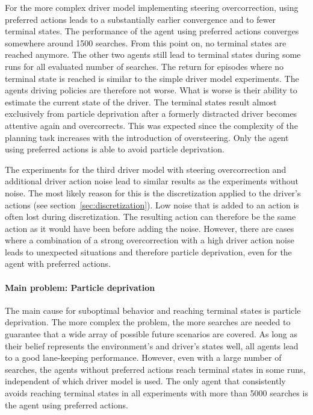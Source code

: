 For the more complex driver model implementing steering overcorrection, using preferred actions leads to a substantially earlier convergence and to fewer terminal states. The performance of the agent using preferred actions converges somewhere around 1500 searches. From this point on, no terminal states are reached anymore. The other two agents still lead to terminal states during some runs for all evaluated number of searches. The return for episodes where no terminal state is reached is similar to the simple driver model experiments. The agents driving policies are therefore not worse. What is worse is their ability to estimate the current state of the driver. The terminal states result almost exclusively from particle deprivation after a formerly distracted driver becomes attentive again and overcorrects. This was expected since the complexity of the planning task increases with the introduction of oversteering. Only the agent using preferred actions is able to avoid particle deprivation.

The experiments for the third driver model with steering overcorrection and additional driver action noise lead to similar results as the experiments without noise. The most likely reason for this is the discretization applied to the driver's actions (see section~\ref{sec:discretization}). Low noise that is added to an action is often lost during discretization. The resulting action can therefore be the same action as it would have been before adding the noise. However, there are cases where a combination of a strong overcorrection with a high driver action noise leads to unexpected situations and therefore particle deprivation, even for the agent with preferred actions.

\paragraph{Main problem: Particle deprivation}

The main cause for suboptimal behavior and reaching terminal states is particle deprivation. The more complex the problem, the more searches are needed to guarantee that a wide array of possible future scenarios are covered. As long as their belief represents the environment's and driver's states well, all agents lead to a good lane-keeping performance. However, even with a large number of searches, the agents without preferred actions reach terminal states in some runs, independent of which driver model is used. The only agent that consistently avoids reaching terminal states in all experiments with more than 5000 searches is the agent using preferred actions. 

